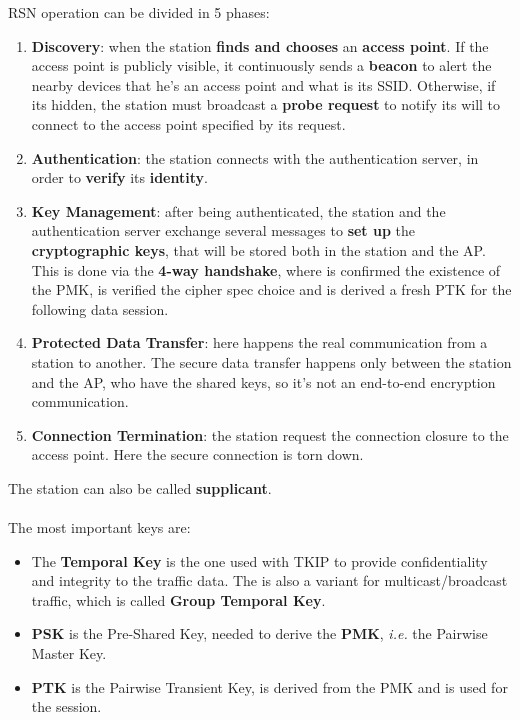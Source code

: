 \documentclass[oneside]{academica}
\begin{document}
RSN operation can be divided in 5 phases:
\begin{enumerate}
  \item \textbf{Discovery}: when the station \textbf{finds and chooses} an \textbf{access point}. If the access point is publicly visible, it continuously sends a \textbf{beacon} to alert the nearby devices that he's an access point and what is its SSID. Otherwise, if its hidden, the station must broadcast a \textbf{probe request} to notify its will to connect to the access point specified by its request.
  \item \textbf{Authentication}: the station connects with the authentication server, in order to \textbf{verify} its \textbf{identity}.
  \item \textbf{Key Management}: after being authenticated, the station and the authentication server exchange several messages to \textbf{set up} the \textbf{cryptographic keys}, that will be stored both in the station and the AP. This is done via the \textbf{4-way handshake}, where is confirmed the existence of the PMK, is verified the cipher spec choice and is derived a fresh PTK for the following data session.
  \item \textbf{Protected Data Transfer}: here happens the real communication from a station to another. The secure data transfer happens only between the station and the AP, who have the shared keys, so it's not an end-to-end encryption communication.
  \item \textbf{Connection Termination}: the station request the connection closure to the access point. Here the secure connection is torn down.
\end{enumerate}
The station can also be called \textbf{supplicant}.
\\\\
The most important keys are:
\begin{itemize}
  \item The \textbf{Temporal Key} is the one used with TKIP to provide confidentiality and integrity to the traffic data. The is also a variant for multicast/broadcast traffic, which is called \textbf{Group Temporal Key}.
  \item \textbf{PSK} is the Pre-Shared Key, needed to derive the \textbf{PMK}, \textit{i.e.} the Pairwise Master Key.
  \item \textbf{PTK} is the Pairwise Transient Key, is derived from the PMK and is used for the session.
\end{itemize}
\end{document}
